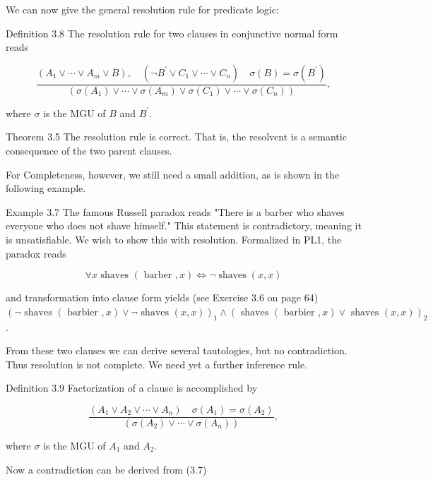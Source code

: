 \documentclass[10pt]{book}
\begin{document}
We can now give the general resolution rule for predicate logic:

Definition 3.8 The resolution rule for two clauses in conjunctive normal form reads


\begin{equation*}
\frac{\left(A_{1} \vee \cdots \vee A_{m} \vee B\right), \quad\left(\neg B^{\prime} \vee C_{1} \vee \cdots \vee C_{n}\right) \quad \sigma(B)=\sigma\left(B^{\prime}\right)}{\left(\sigma\left(A_{1}\right) \vee \cdots \vee \sigma\left(A_{m}\right) \vee \sigma\left(C_{1}\right) \vee \cdots \vee \sigma\left(C_{n}\right)\right)}, \tag{3.6}
\end{equation*}


where $\sigma$ is the MGU of $B$ and $B^{\prime}$.

Theorem 3.5 The resolution rule is correct. That is, the resolvent is a semantic consequence of the two parent clauses.

For Completeness, however, we still need a small addition, as is shown in the following example.


Example 3.7 The famous Russell paradox reads "There is a barber who shaves everyone who does not shave himself." This statement is contradictory, meaning it is unsatisfiable. We wish to show this with resolution. Formalized in PL1, the paradox reads

$$
\forall x \text { shaves }(\text { barber }, x) \Leftrightarrow \neg \operatorname{shaves}(x, x)
$$

and transformation into clause form yields (see Exercise 3.6 on page 64)\\
$(\neg \text { shaves }(\text { barbier }, x) \vee \neg \text { shaves }(x, x))_{1} \wedge(\text { shaves }(\text { barbier }, x) \vee \text { shaves }(x, x))_{2}$.

From these two clauses we can derive several tautologies, but no contradiction. Thus resolution is not complete. We need yet a further inference rule.

Definition 3.9 Factorization of a clause is accomplished by

$$
\frac{\left(A_{1} \vee A_{2} \vee \cdots \vee A_{n}\right) \quad \sigma\left(A_{1}\right)=\sigma\left(A_{2}\right)}{\left(\sigma\left(A_{2}\right) \vee \cdots \vee \sigma\left(A_{n}\right)\right)},
$$

where $\sigma$ is the MGU of $A_{1}$ and $A_{2}$.

Now a contradiction can be derived from (3.7)
\end{document}
